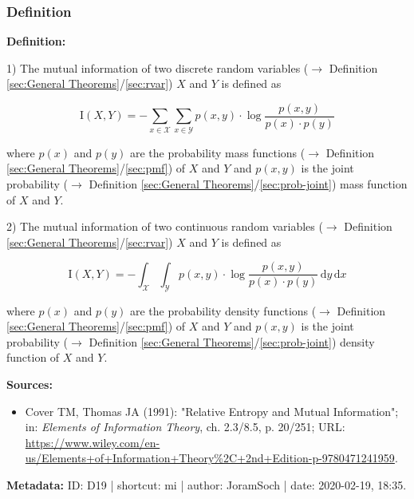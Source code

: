 \documentclass[a4paper,12pt,twoside]{book}
\begin{document}
\subsubsection[\textit{Definition}]{Definition} \label{sec:mi}
\setcounter{equation}{0}

\textbf{Definition:}

1) The mutual information of two discrete random variables ($\rightarrow$ Definition \ref{sec:General Theorems}/\ref{sec:rvar}) $X$ and $Y$ is defined as

\begin{equation} \label{eq:mi-mi-disc}
\mathrm{I}(X,Y) = - \sum_{x \in \mathcal{X}} \sum_{x \in \mathcal{Y}} p(x,y) \cdot \log \frac{p(x,y)}{p(x) \cdot p(y)}
\end{equation}

where $p(x)$ and $p(y)$ are the probability mass functions ($\rightarrow$ Definition \ref{sec:General Theorems}/\ref{sec:pmf}) of $X$ and $Y$ and $p(x,y)$ is the joint probability ($\rightarrow$ Definition \ref{sec:General Theorems}/\ref{sec:prob-joint}) mass function of $X$ and $Y$.

2) The mutual information of two continuous random variables ($\rightarrow$ Definition \ref{sec:General Theorems}/\ref{sec:rvar}) $X$ and $Y$ is defined as

\begin{equation} \label{eq:mi-mi-cont}
\mathrm{I}(X,Y) = - \int_{\mathcal{X}} \int_{\mathcal{Y}} p(x,y) \cdot \log \frac{p(x,y)}{p(x) \cdot p(y)} \, \mathrm{d}y \, \mathrm{d}x
\end{equation}

where $p(x)$ and $p(y)$ are the probability density functions ($\rightarrow$ Definition \ref{sec:General Theorems}/\ref{sec:pmf}) of $X$ and $Y$ and $p(x,y)$ is the joint probability ($\rightarrow$ Definition \ref{sec:General Theorems}/\ref{sec:prob-joint}) density function of $X$ and $Y$.


\vspace{1em}
\textbf{Sources:}
\begin{itemize}
\item Cover TM, Thomas JA (1991): "Relative Entropy and Mutual Information"; in: \textit{Elements of Information Theory}, ch. 2.3/8.5, p. 20/251; URL: \url{https://www.wiley.com/en-us/Elements+of+Information+Theory%2C+2nd+Edition-p-9780471241959}.
\end{itemize}


\vspace{1em}
\textbf{Metadata:} ID: D19 | shortcut: mi | author: JoramSoch | date: 2020-02-19, 18:35.
\vspace{1em}
\end{document}
